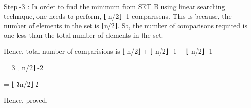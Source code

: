\documentclass[letterpaper,portrait,12pt]{article}
\begin{document}
\begin{flushleft}

\end{flushleft}


\begin{flushleft}
Step -3 :  In order to find the minimum from SET B using linear searching technique, one needs to perform, ⌊ n/2⌋ -1 comparisons. This is because, the number of elements in the set is ⌊n/2⌋. So, the number of comparisons required is one less than the total number of elements in the set.
\end{flushleft}


\begin{flushleft}

\end{flushleft}


\begin{flushleft}
Hence, total number of comparisions is  ⌊ n/2⌋ +  ⌊ n/2⌋ -1 +  ⌊ n/2⌋ -1 
\end{flushleft}


\begin{flushleft}
= 3 ⌊ n/2⌋ -2
\end{flushleft}


\begin{flushleft}
= ⌊ 3n/2⌋-2
\end{flushleft}


\begin{flushleft}
 
\end{flushleft}


\begin{flushleft}
Hence, proved.
\end{flushleft}


\begin{flushleft}

\end{flushleft}


\begin{flushleft}

\end{flushleft}


\begin{flushleft}
 
\end{flushleft}


\begin{flushleft}

\end{flushleft}


\begin{flushleft}

\end{flushleft}
\end{document}
